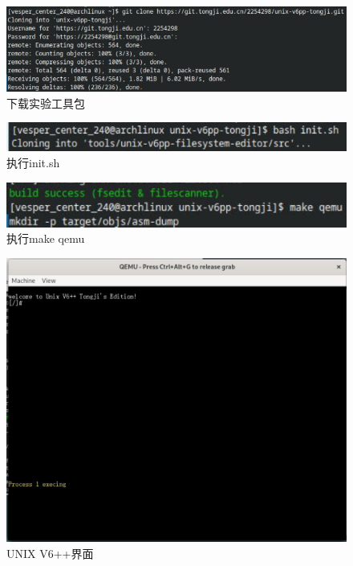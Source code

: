 \begin{figure}[!htbp]
    \centering
    \includegraphics[scale=0.4]{fig/downloadTool.png}
    \caption{下载实验工具包}\label{downloadTool}
\end{figure}

\begin{figure}[!htbp]
    \centering
    \includegraphics[scale=1]{fig/init.png}
    \caption{执行init.sh}\label{init}
\end{figure}

\begin{figure}[!htbp]
    \centering
    \includegraphics[scale=1]{fig/makeQemu.png}
    \caption{执行make qemu}\label{makeQemu}
\end{figure}

\begin{figure}[!htbp]
    \centering
    \includegraphics[scale=0.5]{fig/qemu.png}
    \caption{UNIX V6++界面}\label{qemu}
\end{figure}

